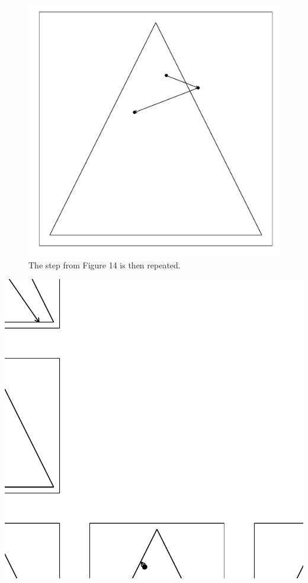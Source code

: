 \documentclass{article}\usepackage{graphicx, color}
\makeatletter
\def\maxwidth{ %
  \ifdim\Gin@nat@width>\linewidth
    \linewidth
  \else
    \Gin@nat@width
  \fi
}
\newenvironment{kframe}{%
 \def\at@end@of@kframe{}%
 \ifinner\ifhmode%
  \def\at@end@of@kframe{\end{minipage}}%
  \begin{minipage}{\columnwidth}%
 \fi\fi%
 \def\FrameCommand##1{\hskip\@totalleftmargin \hskip-\fboxsep
 \colorbox{shadecolor}{##1}\hskip-\fboxsep
     \hskip-\linewidth \hskip-\@totalleftmargin \hskip\columnwidth}%
 \MakeFramed {\advance\hsize-\width
   \@totalleftmargin\z@ \linewidth\hsize
   \@setminipage}}%
 {\par\unskip\endMakeFramed%
 \at@end@of@kframe}
\newenvironment{knitrout}{}{} %
\makeatother
\begin{document}
\begin{figure}[H]
\begin{knitrout}
\color{fgcolor}
\includegraphics[width=\maxwidth]{figure/mirror_walkthrough3} 

\end{knitrout}

\caption{The step from Figure 14 is then repeated.}
\end{figure}

\begin{knitrout}
\color{fgcolor}\begin{kframe}


{\ttfamily\noindent\bfseries\color{errorcolor}{\#\# Error: object '.x37' not found}}\end{kframe}
\includegraphics[width=\maxwidth]{figure/hitandrun_walkthrough} 

\end{knitrout}
\end{document}
